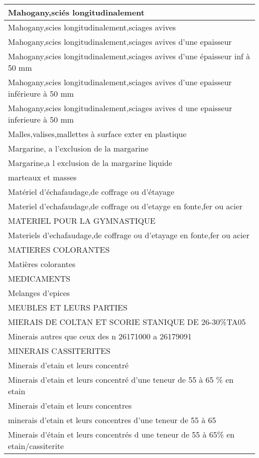 \documentclass[
]{book}
\begin{document}
\begin{table}
\begin{tabular}[t]{l}
Mahogany,sciés longitudinalement\\
\hline
Mahogany,scies longitudinalement,sciages avives\\
\hline
Mahogany,scies longitudinalement,sciages avives d'une epaisseur\\
\hline
Mahogany,scies longitudinalement,sciages avives d'une épaisseur inf à 50 mm\\
\hline
Mahogany,scies longitudinalement,sciages avives d'une epaisseur inférieure à 50 mm\\
\hline
Mahogany,scies longitudinalement,sciages avives d une epaisseur inferieure à 50 mm\\
\hline
Malles,valises,mallettes à surface exter en plastique\\
\hline
Margarine, a l'exclusion de la margarine\\
\hline
Margarine,a l exclusion de la margarine liquide\\
\hline
marteaux et masses\\
\hline
Matériel d'échafaudage,de coffrage ou d'étayage\\
\hline
Materiel d'echafaudage,de coffrage ou d'etayge en fonte,fer ou acier\\
\hline
MATERIEL POUR LA GYMNASTIQUE\\
\hline
Materiels d'echafaudage,de coffrage ou d'etayage en fonte,fer ou acier\\
\hline
MATIERES COLORANTES\\
\hline
Matières colorantes\\
\hline
MEDICAMENTS\\
\hline
Melanges d'epices\\
\hline
MEUBLES ET LEURS PARTIES\\
\hline
MIERAIS DE COLTAN    ET SCORIE STANIQUE DE 26-30\%TA05\\
\hline
Minerais autres que ceux des n 26171000 a 26179091\\
\hline
MINERAIS CASSITERITES\\
\hline
Minerais d'etain et leurs concentré\\
\hline
Minerais d'etain et leurs concentré d'une teneur de 55 à 65 \% en etain\\
\hline
Minerais d'etain et leurs concentres\\
\hline
minerais d'etain et leurs concentres d'une teneur de 55 à 65\\
\hline
Minerais d'étain et leurs concentrés d une teneur de 55 à 65\% en etain/cassiterite\\
\hline

\end{tabular}
\end{table}
\end{document}
